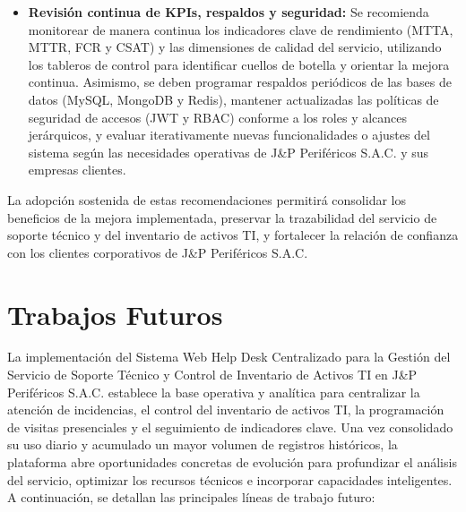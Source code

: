 \begin{itemize}[leftmargin=1.27cm]
    \item \textbf{Revisión continua de KPIs, respaldos y seguridad:} Se recomienda monitorear de manera continua los indicadores clave de rendimiento (MTTA, MTTR, FCR y CSAT) y las dimensiones de calidad del servicio, utilizando los tableros de control para identificar cuellos de botella y orientar la mejora continua. Asimismo, se deben programar respaldos periódicos de las bases de datos (MySQL, MongoDB y Redis), mantener actualizadas las políticas de seguridad de accesos (JWT y RBAC) conforme a los roles y alcances jerárquicos, y evaluar iterativamente nuevas funcionalidades o ajustes del sistema según las necesidades operativas de J\&P Periféricos S.A.C. y sus empresas clientes.
\end{itemize}

La adopción sostenida de estas recomendaciones permitirá consolidar los beneficios de la mejora implementada, preservar la trazabilidad del servicio de soporte técnico y del inventario de activos TI, y fortalecer la relación de confianza con los clientes corporativos de J\&P Periféricos S.A.C.

\section{Trabajos Futuros}

La implementaci\'on del Sistema Web Help Desk Centralizado para la Gestión del Servicio de Soporte Técnico y Control de Inventario de Activos TI en J\&P Periféricos S.A.C. establece la base operativa y anal\'itica para centralizar la atenci\'on de incidencias, el control del inventario de activos TI, la programaci\'on de visitas presenciales y el seguimiento de indicadores clave. Una vez consolidado su uso diario y acumulado un mayor volumen de registros hist\'oricos, la plataforma abre oportunidades concretas de evoluci\'on para profundizar el an\'alisis del servicio, optimizar los recursos t\'ecnicos e incorporar capacidades inteligentes. A continuaci\'on, se detallan las principales l\'ineas de trabajo futuro:

